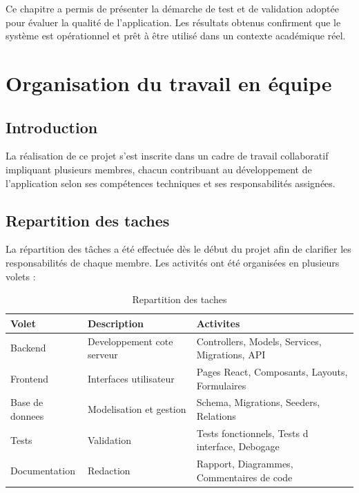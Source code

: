 \documentclass[12pt, a4paper, openright]{report}
\begin{document}
Ce chapitre a permis de présenter la démarche de test et de validation adoptée pour évaluer la qualité de l'application. Les résultats obtenus confirment que le système est opérationnel et prêt à être utilisé dans un contexte académique réel.

\cleardoublepage
\chapter{Organisation du travail en équipe}
\thispagestyle{fancy}

\section{Introduction}

La réalisation de ce projet s'est inscrite dans un cadre de travail collaboratif impliquant plusieurs membres, chacun contribuant au développement de l'application selon ses compétences techniques et ses responsabilités assignées.

\section{Repartition des taches}

La répartition des tâches a été effectuée dès le début du projet afin de clarifier les responsabilités de chaque membre. Les activités ont été organisées en plusieurs volets :

\begin{table}[H]
    \centering
    \begin{tabular}{|l|l|l|}
    \hline
    \textbf{Volet} & \textbf{Description} & \textbf{Activites} \\
    \hline
    Backend & Developpement cote serveur & Controllers, Models, Services, Migrations, API \\
    Frontend & Interfaces utilisateur & Pages React, Composants, Layouts, Formulaires \\
    Base de donnees & Modelisation et gestion & Schema, Migrations, Seeders, Relations \\
    Tests & Validation & Tests fonctionnels, Tests d interface, Debogage \\
    Documentation & Redaction & Rapport, Diagrammes, Commentaires de code \\
    \hline
    \end{tabular}
    \caption{Repartition des taches}
    \label{table:tasks}
\end{table}
\end{document}
